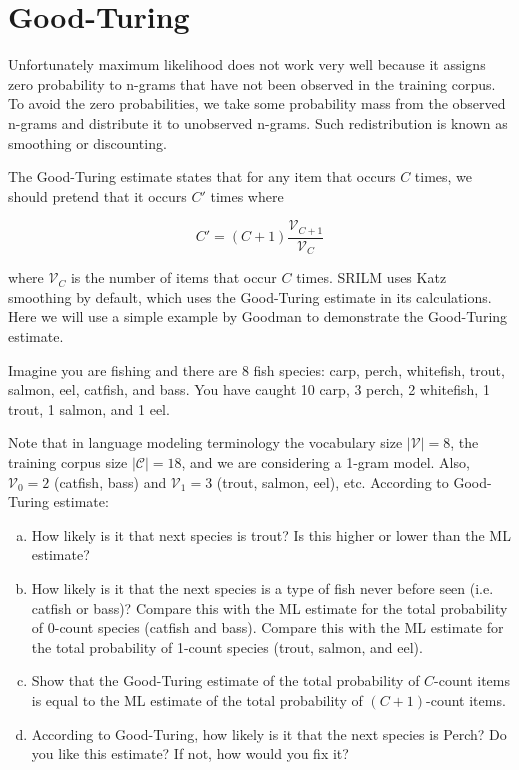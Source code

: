 \documentclass[a4paper]{article}
\newcommand{\vocab}{\mathcal{V}}
\begin{document}
\newpage
\section{Good-Turing}

Unfortunately maximum likelihood does not work very well because it
assigns zero probability to n-grams that have not been observed in the
training corpus.  To avoid the zero probabilities, we take some
probability mass from the observed n-grams and distribute it to
unobserved n-grams.  Such redistribution is known as smoothing or
discounting.

The Good-Turing estimate states that for any item that occurs $C$
times, we should pretend that it occurs $C'$ times where

\[ C' = (C + 1) \frac{\vocab_{C+1}}{\vocab_{C}} \]

where $\vocab_C$ is the number of items that occur $C$
times.  SRILM uses Katz smoothing by default, which uses the
Good-Turing estimate in its calculations.  Here we will use a simple
example by Goodman to demonstrate the Good-Turing estimate.

Imagine you are fishing and there are 8 fish species: carp, perch,
whitefish, trout, salmon, eel, catfish, and bass.  You have caught 10
carp, 3 perch, 2 whitefish, 1 trout, 1 salmon, and 1 eel.  

Note that in language modeling terminology the vocabulary size
$|\vocab|=8$, the training corpus size $|\mathcal{C}|=18$, and we are
considering a 1-gram model.  Also, $\vocab_0 = 2$ (catfish, bass) and
$\vocab_1 = 3$ (trout, salmon, eel), etc.  According to Good-Turing
estimate:

\begin{enumerate}[(a)]
\item How likely is it that next species is trout?  Is this higher or
  lower than the ML estimate?
\vspace*{2cm}

\item How likely is it that the next species is a type of fish never
  before seen (i.e. catfish or bass)?  Compare this with the ML
  estimate for the total probability of 0-count species (catfish and
  bass).  Compare this with the ML estimate for the total probability
  of 1-count species (trout, salmon, and eel).
\vspace*{2cm}

\item Show that the Good-Turing estimate of the total probability of
  $C$-count items is equal to the ML estimate of the total probability
  of $(C+1)$-count items.
\vspace*{4cm}

\item According to Good-Turing, how likely is it that the next species
  is Perch?  Do you like this estimate?  If not, how would you fix it?
\end{enumerate}
\end{document}

